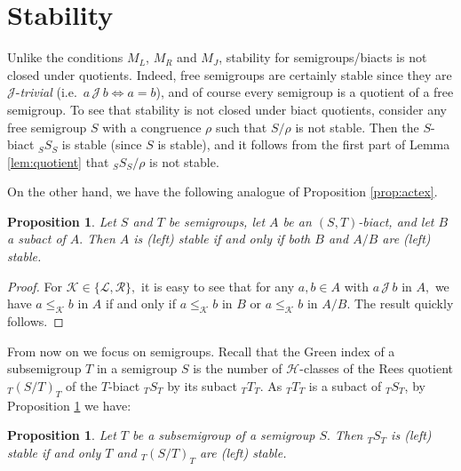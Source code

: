 \documentclass[twoside,a4paper,12pt,reqno]{amsart}
\theoremstyle{plain}
\newtheorem{lem}[thm]{Lemma}
\newtheorem{prop}[thm]{Proposition}
\theoremstyle{definition}
\renewcommand{\l}{\mbox{${\mathcal{L}}$}}
\renewcommand{\r}{\mbox{${\mathcal{R}}$}}
\newcommand{\h}{\mbox{${\mathcal{H}}$}}
\renewcommand{\j}{\mbox{${\mathcal{J}}$}}
\renewcommand{\k}{\mbox{${\mathcal{K}}$}}
\newcommand{\leqk}{\leq_{\mathcal{K}}}
\begin{document}
\section{Stability}\label{sec:stability}

Unlike the conditions $M_L$, $M_R$ and $M_J$, stability for semigroups/biacts is not closed under quotients.  Indeed, free semigroups are certainly stable since they are $\j$-{\em trivial} (i.e.\ $a\,\j\,b\Leftrightarrow a=b$), and of course every semigroup is a quotient of a free semigroup.  To see that stability is not closed under biact quotients, consider any free semigroup $S$ with a congruence $\rho$ such that $S/{\rho}$ is not stable.  Then the $S$-biact ${_S}S_{S}$ is stable (since $S$ is stable), and it follows from the first part of Lemma \ref{lem:quotient} that ${_S}S_S/\rho$ is not stable.


On the other hand, we have the following analogue of Proposition \ref{prop:actex}.

\begin{prop}\label{prop:actex,stab}
Let $S$ and $T$ be semigroups, let $A$ be an $(S,T)$-biact, and let $B$ a subact of $A.$  Then $A$ is (left) stable if and only if both $B$ and $A/B$ are (left) stable.
\end{prop}

\begin{proof}
For $\k\in\{\l,\r\},$ it is easy to see that for any $a,b\in A$ with $a\,\j\,b$ in $A,$ we have $a\leqk b$ in $A$ if and only if $a\leqk b$ in $B$ or $a\leqk b$ in $A/B.$  The result quickly follows.
\end{proof}

From now on we focus on semigroups.  Recall that the Green index of a subsemigroup $T$ in a semigroup $S$ is the number of $\h$-classes of the Rees quotient ${_T}(S/T)_T$ of the $T$-biact ${_T}S_T$ by its subact ${_T}T_T$.  As ${_T}T_T$ is a subact of ${_T}S_T$, by Proposition \ref{prop:actex,stab} we have:

\begin{prop}\label{prop:subsemigroup,stab}
Let $T$ be a subsemigroup of a semigroup $S.$  Then ${_T}S_T$ is (left) stable if and only $T$ and ${_T}(S/T)_T$ are (left) stable.
\end{prop}
\end{document}
